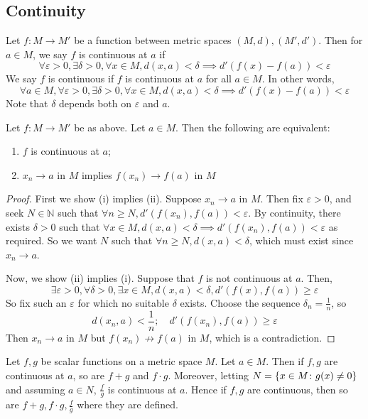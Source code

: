 \subsection{Continuity}
\begin{definition}
	Let \( f \colon M \to M' \) be a function between metric spaces \( (M, d), (M', d') \).
	Then for \( a \in M \), we say \( f \) is continuous at \( a \) if
	\[
		\forall \varepsilon > 0, \exists \delta > 0, \forall x \in M, d(x,a) < \delta \implies d'(f(x) - f(a)) < \varepsilon
	\]
	We say \( f \) is continuous if \( f \) is continuous at \( a \) for all \( a \in M \).
	In other words,
	\[
		\forall a \in M, \forall \varepsilon > 0, \exists \delta > 0, \forall x \in M, d(x,a) < \delta \implies d'(f(x) - f(a)) < \varepsilon
	\]
	Note that \( \delta \) depends both on \( \varepsilon \) and \( a \).
\end{definition}
\begin{proposition}
	Let \( f \colon M \to M' \) be as above.
	Let \( a \in M \).
	Then the following are equivalent:
	\begin{enumerate}
		\item \( f \) is continuous at \( a \);
		\item \( x_n \to a \) in \( M \) implies \( f(x_n) \to f(a) \) in \( M \)
	\end{enumerate}
\end{proposition}
\begin{proof}
	First we show (i) implies (ii).
	Suppose \( x_n \to a \) in \( M \).
	Then fix \( \varepsilon > 0 \), and seek \( N \in \mathbb N \) such that \( \forall n \geq N, d'(f(x_n), f(a)) < \varepsilon \).
	By continuity, there exists \( \delta > 0 \) such that \( \forall x \in M, d(x,a) < \delta \implies d'(f(x_n), f(a)) < \varepsilon \) as required.
	So we want \( N \) such that \( \forall n \geq N, d(x,a) < \delta \), which must exist since \( x_n \to a \).

	Now, we show (ii) implies (i).
	Suppose that \( f \) is not continuous at \( a \).
	Then,
	\[
		\exists \varepsilon > 0, \forall \delta > 0, \exists x \in M, d(x,a) < \delta, d'(f(x), f(a)) \geq \varepsilon
	\]
	So fix such an \( \varepsilon \) for which no suitable \( \delta \) exists.
	Choose the sequence \( \delta_n = \frac{1}{n} \), so
	\[
		d(x_n,a) < \frac{1}{n};\quad d'(f(x_n), f(a)) \geq \varepsilon
	\]
	Then \( x_n \to a \) in \( M \) but \( f(x_n) \not\to f(a) \) in \( M \), which is a contradiction.
\end{proof}
\begin{proposition}
	Let \( f,g \) be scalar functions on a metric space \( M \).
	Let \( a \in M \).
	Then if \( f,g \) are continuous at \( a \), so are \( f+g \) and \( f \cdot g \).
	Moreover, letting \( N = \qty{x \in M \colon g(x) \neq 0} \) and assuming \( a \in N \), \( \frac{f}{g} \) is continuous at \( a \).
	Hence if \( f,g \) are continuous, then so are \( f+g, f \cdot g, \frac{f}{g} \) where they are defined.
\end{proposition}

